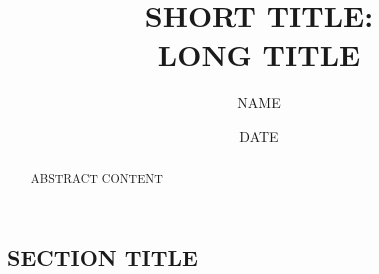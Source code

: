 \documentclass[10pt, oneside, letterpaper]{article}
\title{\textbf{SHORT TITLE:\\LONG TITLE}}
\author{NAME}
\affil{AFFILIATION}
\date{DATE}
\begin{document}
	\maketitle

	\begin{abstract}
		ABSTRACT CONTENT
	\end{abstract}

	\begin{multicols}{2}

	\section{SECTION TITLE}

  \cite{CITATION}

	\end{multicols}

	{\RaggedRight
		
		
	}
\end{document}
